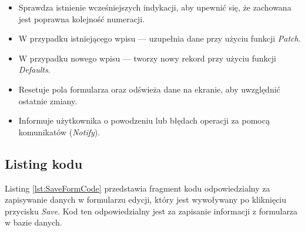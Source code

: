 \begin{itemize}
\item Sprawdza istnienie wcześniejszych indykacji, aby upewnić się, że zachowana jest poprawna kolejność numeracji.
\item W przypadku istniejącego wpisu — uzupełnia dane przy użyciu funkcji \emph{Patch}.
\item W przypadku nowego wpisu — tworzy nowy rekord przy użyciu funkcji \emph{Defaults}.
\item Resetuje pola formularza oraz odświeża dane na ekranie, aby uwzględnić ostatnie zmiany.
\item Informuje użytkownika o powodzeniu lub błędach operacji za pomocą komunikatów (\emph{Notify}).
\end{itemize}

\subsection{Listing kodu}

Listing \ref{lst:SaveFormCode} przedstawia fragment kodu odpowiedzialny za zapisywanie danych w formularzu edycji, który jest wywoływany po kliknięciu przycisku \emph{Save}. Kod ten odpowiedzialny jest za zapisanie informacji z formularza w bazie danych.

